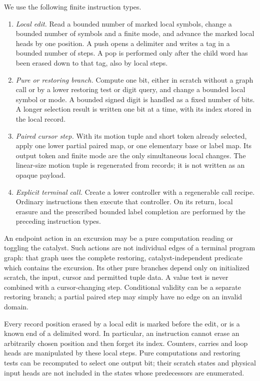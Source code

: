 We use the following finite instruction types.
\begin{enumerate}
\item \emph{Local edit.} Read a bounded number of marked local symbols,
  change a bounded number of symbols and a finite mode, and advance the
  marked local heads by one position.  A push opens a delimiter and
  writes a tag in a bounded number of steps.  A pop is performed only
  after the child word has been erased down to that tag, also by local
  steps.
\item \emph{Pure or restoring branch.} Compute one bit, either in scratch
  without a graph call or by a lower restoring test or digit query, and
  change a bounded local symbol or mode.  A bounded signed digit is
  handled as a fixed number of bits.  A longer selection result is
  written one bit at a time, with its index stored in the local record.
\item \emph{Paired cursor step.} With its motion tuple and short token
  already selected, apply one lower partial paired map, or one elementary
  base or label map.  Its output token and finite mode are the only
  simultaneous local changes.  The linear-size motion tuple is
  regenerated from records; it is not written as an opaque payload.
\item \emph{Explicit terminal call.} Create a lower controller with a
  regenerable call recipe.  Ordinary instructions then execute that
  controller.  On its return, local erasure and the prescribed bounded
  label completion are performed by the preceding instruction types.
\end{enumerate}
An endpoint action in an excursion may be a pure computation reading or
toggling the catalyst.  Such actions are not individual edges of a
terminal program graph: that graph uses the complete restoring,
catalyst-independent predicate which contains the excursion.  Its other
pure branches depend only on initialized scratch, the input, cursor and
permitted tuple data.  A value test is never combined with a cursor-changing
step.  Conditional validity can be a separate restoring branch; a
partial paired step may simply have no edge on an invalid domain.

Every record position erased by a local edit is marked before the edit,
or is a known end of a delimited word.  In particular, an instruction
cannot erase an arbitrarily chosen position and then forget its index.
Counters, carries and loop heads are manipulated by these local steps.
Pure computations and restoring tests can be recomputed to select one
output bit; their scratch states and physical input heads are not
included in the states whose predecessors are enumerated.

